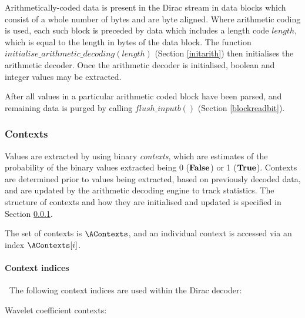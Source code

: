 Arithmetically-coded data is present in the Dirac stream in data blocks which consist of
a whole number of bytes and are byte aligned. Where arithmetic coding is used, each such
block is preceded by data which includes a length code $length$, which is equal to the length in
bytes of the data block. The function $initialise\_arithmetic\_decoding(length)$
(Section \ref{initarith}) then initialises the arithmetic decoder. Once the arithmetic
decoder is initialised, boolean and integer values may be extracted.

After all values in a particular arithmetic coded block have been parsed, and remaining data
is purged by calling $flush\_inputb()$ (Section \ref{blockreadbit}).



\subsubsection{Contexts}
\label{arithcontexts}

Values are extracted by using binary {\em contexts}, which are estimates of the 
probability of the binary values extracted being 0 ($\text{\bf{False}}$) or 1 ($\text{\bf{True}}$).
Contexts are determined prior to values being extracted, based on previously
decoded data, and are updated by the arithmetic decoding engine to track 
statistics. The structure of contexts and how they are initialised and updated 
is specified in Section \ref{arithcontexts}.

The set of contexts is $\AContexts$, and an individual context is accessed via
an index $\AContexts[i]$. 

\paragraph{Context indices}
\label{contextindices}
$\ $\newline
The following context indices are used within the Dirac decoder:

Wavelet coefficient contexts:

\SignZero\\
\SignPos\\
\SignNeg\\
\ZPZNFollowOne\\
\ZPNNFollowOne\\
\ZPFollowTwo\\
\ZPFollowThree\\
\ZPFollowFour\\
\ZPFollowFive\\
\ZPFollowSixPlus\\
\NPZNFollowOne\\
\NPNNFollowOne\\
\NPFollowTwo\\
\NPFollowThree\\
\NPFollowFour\\
\NPFollowFive\\
\NPFollowSixPlus\\
\CoeffData\\
\ZeroCodeblock\\
\QOffsetFollow\\
\QOffsetData\\
\QOffsetSign\\

